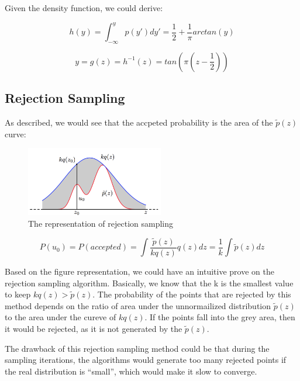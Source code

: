 \documentclass{article} %
\begin{document}
Given the density function, we could derive:

\begin{equation}
h (y) = \int_{-\infty}^y p(y') dy' = \frac{1}{2} + \frac{1}{\pi} arctan(y)
\end{equation}

\begin{equation}
y = g (z) = h^{-1} (z) = tan(\pi (z - \frac{1}{2}))
\end{equation}


\subsection{Rejection Sampling}
As described, we would see that the accpeted probability is the area of the
$\tilde{p} (z)$ curve:

\begin{figure}[!htbp]
\begin{center}
\includegraphics[width=60mm]{pic/q21.png}
\end{center}
\caption{The representation of rejection sampling}
\end{figure}

\begin{equation}
P (u_0) = P (accepted)
= \int \frac{\tilde{p} (z)}{k q (z)} q (z) dz
= \frac{1}{k} \int \tilde{p} (z) dz
\end{equation}

Based on the figure representation, we could have an intuitive prove on
the rejection sampling algorithm. Basically, we know that the k is the smallest
value to keep $kq (z) > \tilde{p} (z)$. The probability of the points that are
rejected by this method depends on the ratio of area under the unnormailized
distribution $\tilde{p} (z)$ to the area under the cureve of $kq (z)$. If the
points fall into the grey area, then it would be rejected, as it is not
generated by the $\tilde{p} (z)$.

The drawback of this rejection sampling method could be that during the sampling
iterations, the algorithms would generate too many rejected points if the real
distribution is ``small'', which would make it slow to converge.
\end{document}
